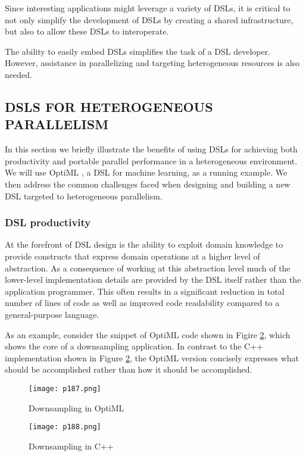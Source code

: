 Since interesting applications might leverage a variety of DSLs,
it is critical to not only simplify the development of DSLs by 
creating a shared infrastructure, but also to allow these DSLs to interoperate.

The ability to easily embed DSLs simplifies the task of a DSL
developer. However, assistance in parallelizing and targeting heterogeneous resources is also needed. 



\subsection{DSLS FOR HETEROGENEOUS PARALLELISM\cite{brown2011heterogeneous}}

In this section we briefly illustrate the benefits of using
DSLs for achieving both productivity and portable parallel
performance in a heterogeneous environment. We will use
OptiML \cite{sujeeth2011optiml}, a DSL for machine learning, as a running
example. We then address the common challenges faced when
designing and building a new DSL targeted to heterogeneous
parallelism.


\subsubsection{DSL productivity}

At the forefront of DSL design is the ability to exploit
domain knowledge to provide constructs that express domain
operations at a higher level of abstraction. As a consequence of working at this abstraction level much of the lower-level
implementation details are provided by the DSL itself rather
than the application programmer. This often results in a
significant reduction in total number of lines of code as well
as improved code readability compared to a general-purpose
language.

As an example, consider the snippet of OptiML code
shown in Figire \ref{fig:p184}, which shows the core of a downsampling
application. In contrast to the C++ implementation shown in
Figure \ref{fig:p184}, the OptiML version concisely expresses what should
be accomplished rather than how it should be accomplished.

\begin{figure}[H]
	\centering
	\texttt{[image: p187.png]}
	\caption{ Downsampling in OptiML}
	\label{fig:p184}
\end{figure}

\begin{figure}[H]
	\centering
	\texttt{[image: p188.png]}
	\caption{Downsampling in C++}
	\label{fig:p184}
\end{figure}


